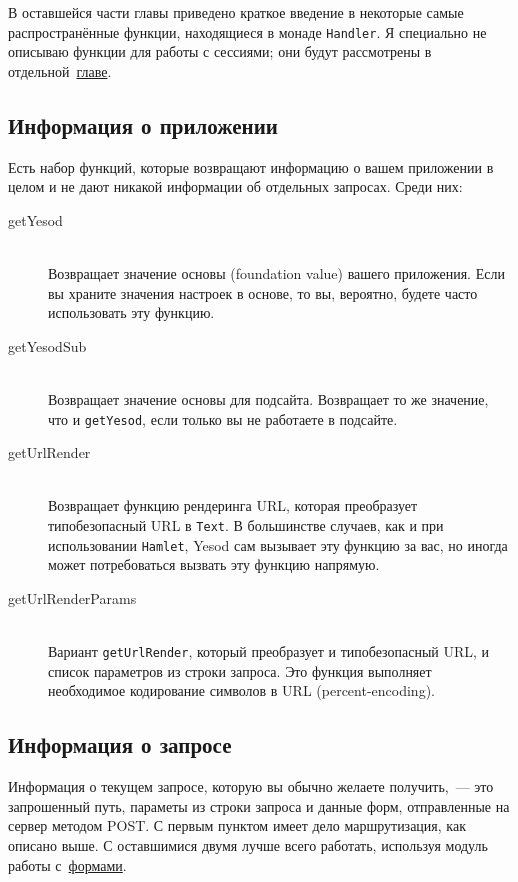 В оставшейся части главы приведено краткое введение в некоторые
самые распространённые функции, находящиеся в монаде
\lstinline!Handler!. Я специально не описываю функции для работы с
сессиями; они будут рассмотрены в отдельной~\hyperref[chap:sessions]{главе}.

\subsection{Информация о приложении}
Есть набор функций, которые возвращают информацию о вашем приложении в
целом и не дают никакой информации об отдельных запросах. Среди них:
\begin{description}
\item[getYesod] \hfill \\
  Возвращает значение основы (foundation value) вашего приложения. Если вы храните
  значения настроек в основе, то вы, вероятно, будете часто использовать эту функцию.

\item[getYesodSub] \hfill \\
  Возвращает значение основы для подсайта. Возвращает то же значение, что и
  \lstinline!getYesod!, если только вы не работаете в подсайте.

\item[getUrlRender] \hfill \\
  Возвращает функцию рендеринга URL, которая преобразует типобезопасный URL в
  \lstinline!Text!. В большинстве случаев, как и при использовании \lstinline!Hamlet!,
  Yesod сам вызывает эту функцию за вас, но иногда может потребоваться вызвать эту функцию
  напрямую.

\item[getUrlRenderParams]  \hfill \\
  Вариант \lstinline!getUrlRender!, который преобразует и типобезопасный URL, и список
  параметров из строки запроса. Это функция выполняет необходимое кодирование символов в
  URL (percent-encoding).
\end{description}

\subsection{Информация о запросе}
Информация о текущем запросе, которую вы обычно желаете получить,~--- это запрошенный
путь, параметы из строки запроса и данные форм, отправленные на сервер методом POST. С
первым пунктом имеет дело маршрутизация, как описано выше. С оставшимися двумя лучше всего
работать, используя модуль работы с~\hyperref[chap:forms]{формами}.

